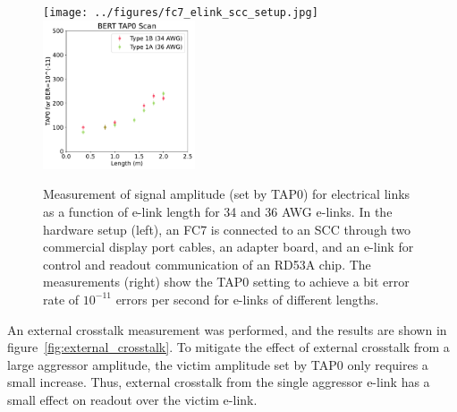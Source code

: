 \documentclass[a4paper,11pt]{article}
\begin{document}
\begin{figure}[htbp]
\centering
\texttt{[image: ../figures/fc7\_elink\_scc\_setup.jpg]}
\qquad
\includegraphics[width=0.4\textwidth,origin=c]{../figures/BERT_TAP0_vs_Length.pdf}
\caption{
\label{fig:tap0_vs_length}
Measurement of signal amplitude (set by TAP0) for electrical links as a function of e-link length for 34 and 36 AWG e-links.
In the hardware setup (left), an FC7 is connected to an SCC through two commercial display port cables, an adapter board, and an e-link for control and readout communication of an RD53A chip.
The measurements (right) show the TAP0 setting to achieve a bit error rate of $10^{-11}$ errors per second for e-links of different lengths.
}
\end{figure}


An external crosstalk measurement was performed, and the results are shown in figure~\ref{fig:external_crosstalk}.
To mitigate the effect of external crosstalk from a large aggressor amplitude, the victim amplitude set by TAP0 only requires a small increase.
Thus, external crosstalk from the single aggressor e-link has a small effect on readout over the victim e-link.
\end{document}
